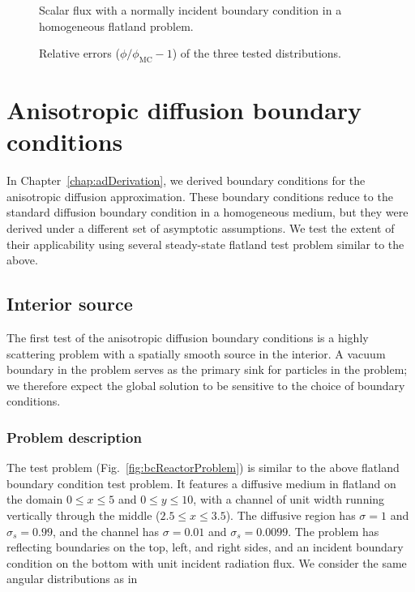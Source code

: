 \begin{figure}[tb]
  \centering\small
  \hspace{-.25in}%
  
  \caption{Scalar flux with a normally incident boundary condition in a
  homogeneous flatland problem.}
  \label{fig:flatlandBcDelta}
\end{figure}
 
\begin{figure}[tb]
  \centering\small
  \hspace{-.25in}%
  
  \caption{Relative errors ($\phi/\phi_\text{MC} - 1$) of the three tested
  distributions.}
  \label{fig:flatlandBcRelative}
\end{figure}

\section{Anisotropic diffusion boundary conditions}

In Chapter~\ref{chap:adDerivation}, we derived boundary conditions for the
anisotropic diffusion approximation. These boundary conditions reduce to the
standard diffusion boundary condition in a homogeneous medium, but they were
derived under a different set of asymptotic assumptions. We test the extent of
their applicability using several steady-state flatland test problem similar to
the above.

\subsection{Interior source}

The first test of the anisotropic diffusion boundary conditions is a highly
scattering problem with a spatially smooth source in the interior. A vacuum
boundary in the problem serves as the primary sink for particles in the
problem; we therefore expect the global solution to be sensitive to the choice
of boundary conditions.

\subsubsection{Problem description}

The test problem (Fig.~\ref{fig:bcReactorProblem}) is similar to the above
flatland boundary condition test
problem. It features a diffusive medium in flatland on the domain $0
\le x \le 5$ and $0 \le y \le 10$, with a channel of unit width running
vertically through the middle ($2.5 \le x \le 3.5$). The diffusive region has
$\sigma=1$ and $\sigma_s=0.99$, and the channel has $\sigma=0.01$ and
$\sigma_s=0.0099$.
The problem has reflecting boundaries on the top, left, and
right sides, and an incident boundary condition on the bottom with unit
incident radiation flux. We consider the same angular distributions as in

